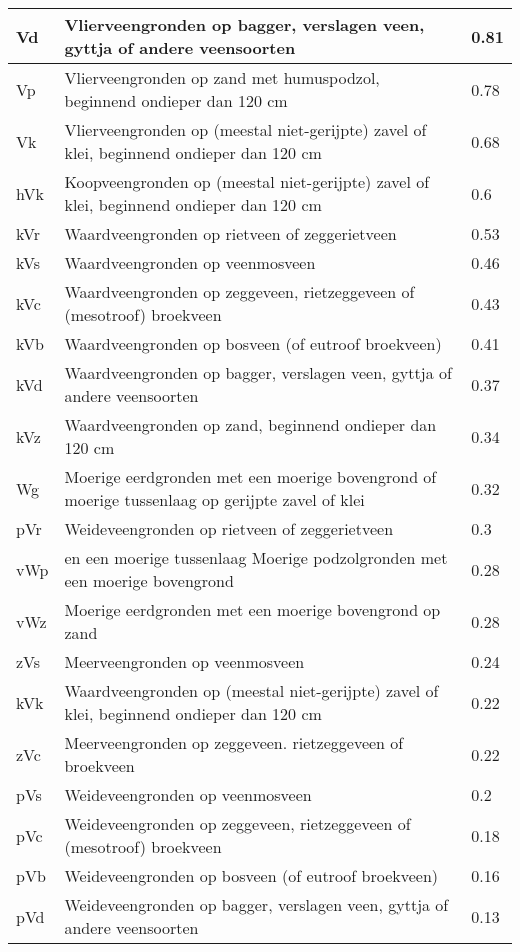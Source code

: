 \documentclass[a4paper,12pt]{scrbook}
\begin{document}
{\begin{appendices}
\begin{center}
\begin{longtable}{|l| p{11cm} | l |}
Vd & Vlierveengronden op bagger, verslagen veen, gyttja of andere veensoorten & 0.81 \\ \hline
Vp & Vlierveengronden op zand met humuspodzol, beginnend ondieper dan 120 cm  & 0.78 \\ \hline
Vk & Vlierveengronden op (meestal niet-gerijpte) zavel of klei, beginnend ondieper dan 120 cm  & 0.68 \\ \hline
hVk & Koopveengronden op (meestal niet-gerijpte) zavel of klei, beginnend ondieper dan 120 cm  & 0.6 \\ \hline
kVr & Waardveengronden op rietveen of zeggerietveen  & 0.53 \\ \hline
kVs & Waardveengronden op veenmosveen  & 0.46 \\ \hline
kVc & Waardveengronden op zeggeveen, rietzeggeveen of (mesotroof) broekveen  & 0.43 \\ \hline
kVb & Waardveengronden op bosveen (of eutroof broekveen) & 0.41 \\ \hline
kVd & Waardveengronden op bagger, verslagen veen, gyttja of andere veensoorten  & 0.37 \\ \hline
kVz & Waardveengronden op zand, beginnend ondieper dan 120 cm  & 0.34 \\ \hline
Wg & Moerige eerdgronden met een moerige bovengrond of  moerige tussenlaag op gerijpte zavel of klei  & 0.32 \\ \hline
pVr & Weideveengronden op rietveen of zeggerietveen  & 0.3 \\ \hline
vWp & en een moerige tussenlaag Moerige podzolgronden met een moerige bovengrond  & 0.28 \\ \hline
vWz & Moerige eerdgronden met een moerige bovengrond op zand  & 0.28 \\ \hline
zVs & Meerveengronden op veenmosveen  & 0.24 \\ \hline
kVk & Waardveengronden op (meestal niet-gerijpte) zavel of klei, beginnend ondieper dan 120 cm  & 0.22 \\ \hline
zVc & Meerveengronden op zeggeveen. rietzeggeveen of broekveen  & 0.22 \\ \hline
pVs & Weideveengronden op veenmosveen  & 0.2 \\ \hline
pVc & Weideveengronden op zeggeveen, rietzeggeveen of (mesotroof) broekveen  & 0.18 \\ \hline
pVb & Weideveengronden op bosveen (of eutroof broekveen)  & 0.16 \\ \hline
pVd & Weideveengronden op bagger, verslagen veen, gyttja of andere veensoorten & 0.13 \\ \hline

\end{longtable}
\end{center}
\end{appendices}}
\end{document}
